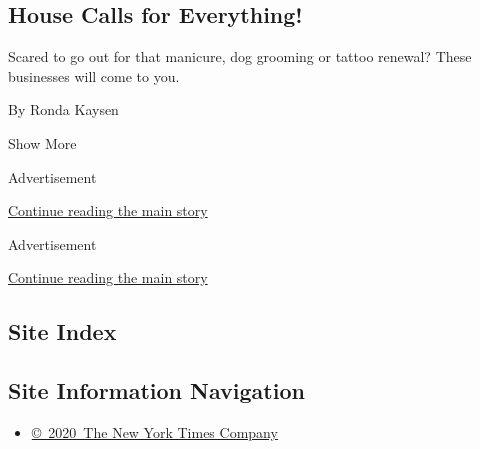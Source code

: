 \begin{enumerate}
  \hypertarget{house-calls-for-everything}{%
  \subsection{House Calls for
  Everything!}\label{house-calls-for-everything}}

  Scared to go out for that manicure, dog grooming or tattoo renewal?
  These businesses will come to you.

  By Ronda Kaysen
\end{enumerate}

Show More

Advertisement

\protect\hyperlink{after-mid1}{Continue reading the main story}

Advertisement

\protect\hyperlink{after-mktg}{Continue reading the main story}

\hypertarget{site-index}{%
\subsection{Site Index}\label{site-index}}

\hypertarget{site-information-navigation}{%
\subsection{Site Information
Navigation}\label{site-information-navigation}}

\begin{itemize}
\tightlist
\item
  \href{https://help.nytimes3xbfgragh.onion/hc/en-us/articles/115014792127-Copyright-notice}{©~2020~The
  New York Times Company}
\end{itemize}

